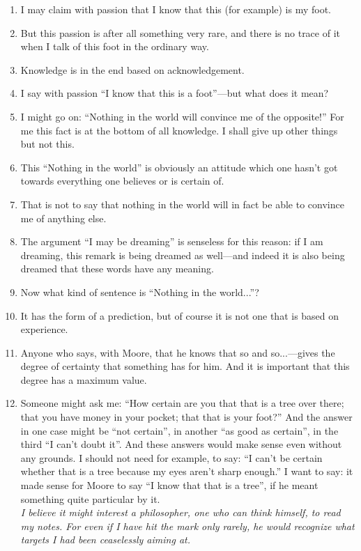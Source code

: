 \documentclass{book}
\begin{document}
\begin{enumerate}
\item
I may claim with passion that I know that this (for example) is my foot.

\item
But this passion is after all something very rare, and there is no trace of it
when I talk of this foot in the ordinary way.

\item
Knowledge is in the end based on acknowledgement.

\item
I say with passion ``I know that this is a foot''---but what does it mean?

\item
I might go on: ``Nothing in the world will convince me of the opposite!'' For
me this fact is at the bottom of all knowledge. I shall give up other things
but not this.

\item
This ``Nothing in the world'' is obviously an attitude which one hasn't got
towards everything one believes or is certain of.

\item
That is not to say that nothing in the world will in fact be able to convince
me of anything else.

\item
The argument ``I may be dreaming'' is senseless for this reason: if I am
dreaming, this remark is being dreamed as well---and indeed it is also being
dreamed that these words have any meaning.

\item
Now what kind of sentence is ``Nothing in the world...''?

\item
It has the form of a prediction, but of course it is not one that is based on
experience.

\item
Anyone who says, with Moore, that he knows that so and so...---gives the degree
of certainty that something has for him. And it is important that this degree
has a maximum value.

\item
Someone might ask me: ``How certain are you that that is a tree over there;
that you have money in your pocket; that that is your foot?'' And the answer in
one case might be ``not certain'', in another ``as good as certain'', in the
third ``I can't doubt it''. And these answers would make sense even without any
grounds. I should not need for example, to say: ``I can't be certain whether
that is a tree because my eyes aren't sharp enough.'' I want to say: it made
sense for Moore to say ``I know that that is a tree'', if he meant something
quite particular by it.
\\
\emph{I believe it might interest a philosopher, one who can think himself, to
read my notes. For even if I have hit the mark only rarely, he would recognize
what targets I had been ceaselessly aiming at.}


\end{enumerate}
\end{document}
